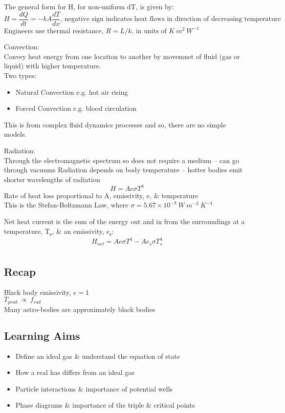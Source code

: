 \documentclass[a4paper, 11pt, fleqn, normalem]{report}
\begin{document}
The general form for H, for non-uniform dT, is given by:
\begin{equation*}
	H = \frac{dQ}{dt} = -kA\frac{dT}{dx}\text{, negative sign indicates heat flows in direction of decreasing temperature}
\end{equation*}
Engineers use thermal resistance, $R = L/k \text{, in units of } K~m^{2}~W^{-1}$

Convection: \\
Convey heat energy from one location to another by movemnet of fluid (gas or liquid) with higher temperature. \\
Two types:
\begin{itemize}
	\item Natural Convection e.g. hot air rising
	\item Forced Convection e.g. blood circulation
\end{itemize}
This is from complex fluid dynamics processes and so, there are no simple models.

Radiation: \\
Through the electromagnetic spectrum so does not require a medium -- can go through vacuums
Radiation depends on body temperature -- hotter bodies emit shorter wavelengths of radiation
\begin{equation*}
	H = Ae{\sigma}T^{4}
\end{equation*}
Rate of heat loss proportional to A, emissivity, e, \& temperature \\
This is the Stefan-Boltzmann Law, where $\sigma = 5.67\times10^{-8}~W~m^{-2}~K^{-4}$

Net heat current is the sum of the energy out and in from the surroundings at a temperature, T\textsubscript{s}, \& an emissivity, e\textsubscript{s}:
\begin{equation*}
	H_{net} = Ae{\sigma}T^{4} - Ae_{s}{\sigma}T^{4}_{s}
\end{equation*}

\chapter{}
\section{Recap}
Black body emissivity, $e = 1$ \\
$T_{peak} ~\propto~f_{rad}$ \\
Many astro-bodies are approximately black bodies

\section{Learning Aims}
\begin{itemize}
	\item Define an ideal gas \& understand the equation of state
	\item How a real has differs from an ideal gas
	\item Particle interactions \& importance of potential wells
	\item Phase diagrams \& importance of the triple \& critical points
\end{itemize}
\end{document}
